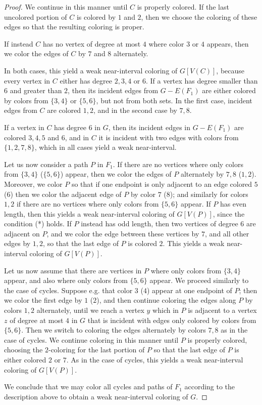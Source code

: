 \documentclass[12pt]{article}
\theoremstyle{plain}
\theoremstyle{definition}
\numberwithin{equation}{section}
\begin{document}
\begin{proof}
	We continue in this manner until $C$ is properly colored. If the last uncolored portion of 
	$C$ is colored by $1$ and $2$, then we choose the coloring
	of these edges so that the resulting coloring is proper.

	If instead $C$ has no vertex of degree at most $4$ where color $3$ or $4$ appears, 
	then we color the edges of $C$ by $7$ and $8$
	alternately.
	
	In both cases, this yield a weak near-interval coloring of $G[V(C)]$, because every vertex in $C$ 
	either has degree 
	$2,3,4$ or $6$. If a vertex has degree smaller than $6$ and greater than $2$,
	then its incident edges from $G-E(F_1)$ are either colored by colors from $\{3,4\}$ or 
	$\{5,6\}$, but not from both sets. In the first case, incident edges from $C$ are colored $1,2$,
	and in the second case by $7,8$.
	
	If a vertex in $C$ has degree $6$ in $G$, then its incident
	edges in $G-E(F_1)$ are colored $3,4,5$ and $6$, and in $C$ it is incident with 
	two edges with colors from $\{1,2,7,8\}$, which
	in all cases yield a weak near-interval.


	\bigskip

	Let us now consider a path $P$ in $F_1$. If there are no vertices where only colors 
	from $\{3,4\}$ ($\{5,6\}$) appear,
	then we color the edges of $P$ alternately by $7,8$ ($1,2$). Moreover, we color $P$ 
	so that if one endpoint is only adjacent to an edge colored $5$ ($6$) then we 
	color the adjacent edge of $P$ by color $7$ ($8$); and
	similarly for colors $1,2$ if there are no vertices where only colors from $\{5,6\}$ appear. 
	If $P$ has even length, then
	this yields a weak near-interval coloring of $G[V(P)]$,
	since the condition (*) holds.
	If $P$ instead has odd length, then two vertices of degree $6$ are adjacent on $P$, and we color
	the edge between these vertices by $7$, and all other edges by $1,2$, so that the last
	edge of $P$ is colored $2$. This yields a weak near-interval coloring of  $G[V(P)]$.

	Let us now assume that there are vertices in $P$ where only colors from $\{3,4\}$ appear, 
	and also where only colors from $\{5,6\}$ appear.
	We proceed similarly to the case of cycles. Suppose e.g. that color $3$ ($4$) appear at 
	one endpoint of $P$; then we color the first edge
	by $1$ ($2$), and then continue coloring the edges along 
	$P$ by colors $1,2$ alternately, until we reach a vertex
	$y$ which in $P$ is adjacent to a vertex $z$ of degree at most $4$ in $G$ that is incident with 
	edges only colored by colors from $\{5,6\}$.
	Then we switch to coloring the edges alternately by colors $7,8$ as in the case of cycles. 
	We continue coloring in this manner until
	$P$ is properly colored, choosing the $2$-coloring for the last portion of $P$ so that 
	the last edge of $P$ is either colored $2$
	or $7$.
	As in the case of cycles, this yields a weak near-interval coloring of $G[V(P)]$.

\bigskip
	
	We conclude that we may color all cycles and paths of $F_1$ according to the description above to
	obtain a weak near-interval coloring of $G$.	
\end{proof}
\end{document}
